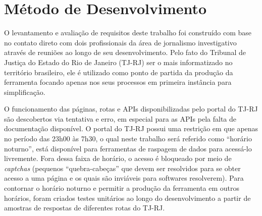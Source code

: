 \section{Método de Desenvolvimento}

O levantamento e avaliação de requisitos deste trabalho foi construído com base
no contato direto com dois profissionais da área de jornalismo investigativo
através de reuniões ao longo de seu desenvolvimento. Pelo fato do Tribunal de
Justiça do Estado do Rio de Janeiro (TJ-RJ) ser o mais informatizado no
território brasileiro, ele é utilizado como ponto de partida da produção da
ferramenta \tjscraper focando apenas nos seus processos em primeira instância
para simplificação.

O funcionamento das páginas, rotas e APIs disponibilizadas pelo portal do TJ-RJ
são descobertos via tentativa e erro, em especial para as APIs pela falta de
documentação disponível. O portal do TJ-RJ possui uma restrição em que apenas
no período das 23h00 às 7h30, o qual neste trabalho será referido como
``horário noturno'', está disponível para ferramentas de raspagem de dados para
acessá-lo livremente. Fora dessa faixa de horário, o acesso é bloqueado por
meio de \textit{captchas} (pequenos ``quebra-cabeças'' que devem ser resolvidos
para se obter acesso a uma página e os quais são inviáveis para softwares
resolverem). Para contornar o horário noturno e permitir a produção da
ferramenta em outros horários, foram criados testes unitários ao longo do
desenvolvimento a partir de amostras de respostas de diferentes rotas do TJ-RJ.
